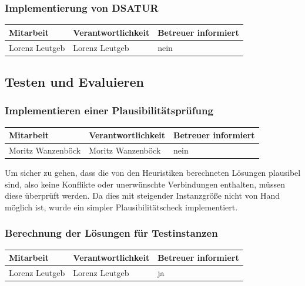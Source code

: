 \subsubsection{ Implementierung von DSATUR}

\begin{center}
\begin{tabular}{lll}
	Mitarbeit & Verantwortlichkeit & Betreuer informiert \\
	\hline
	Lorenz Leutgeb & Lorenz Leutgeb & nein \\
\end{tabular}
\end{center}

\subsection{Testen und Evaluieren}

\subsubsection{ Implementieren einer Plausibilitätsprüfung}

\begin{center}
\begin{tabular}{lll}
	Mitarbeit & Verantwortlichkeit & Betreuer informiert \\
	\hline
	Moritz Wanzenböck & Moritz Wanzenböck & nein \\
\end{tabular}
\end{center}

Um sicher zu gehen, dass die von den Heuristiken berechneten Lösungen plausibel sind, also keine Konflikte oder unerwünschte Verbindungen enthalten, müssen diese überprüft werden. Da dies mit steigender Instanzgröße nicht von Hand möglich ist, wurde ein simpler Plau\-si\-bi\-li\-täts\-check implementiert.

\subsubsection{ Berechnung der Lösungen für Testinstanzen}

\begin{center}
\begin{tabular}{lll}
	Mitarbeit & Verantwortlichkeit & Betreuer informiert \\
	\hline
	Lorenz Leutgeb & Lorenz Leutgeb & ja \\
\end{tabular}
\end{center}


